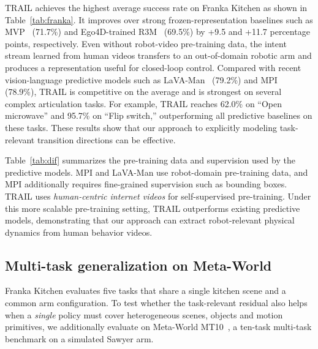 TRAIL achieves the highest average success rate on Franka Kitchen as shown in Table~\ref{tab:franka}. It improves over strong frozen-representation baselines such as MVP~\cite{radosavovic2023real} (71.7\%) and Ego4D-trained R3M~\cite{nair2022r3m} (69.5\%) by +9.5 and +11.7 percentage points, respectively. Even without robot-video pre-training data, the intent stream learned from human videos transfers to an out-of-domain robotic arm and produces a representation useful for closed-loop control.
Compared with recent vision-language predictive models such as LaVA-Man~\cite{zhu2025lava} (79.2\%) and MPI~\cite{zeng2024learning} (78.9\%), TRAIL is competitive on the average and is strongest on several complex articulation tasks. For example, TRAIL reaches {62.0\%} on ``Open microwave'' and {95.7\%} on ``Flip switch,'' outperforming all predictive baselines on these tasks. 
These results show that our approach to explicitly modeling task-relevant transition directions can be effective.



\vspace{-1pt}


Table~\ref{tab:dif} summarizes the pre-training data and supervision used by the predictive models. MPI and LaVA-Man use robot-domain pre-training data, and MPI additionally requires fine-grained supervision such as bounding boxes. TRAIL uses \textit{human-centric internet videos} for self-supervised pre-training. Under this more scalable pre-training setting, TRAIL outperforms existing predictive models, demonstrating that our approach can extract robot-relevant physical dynamics from human behavior videos.



\vspace{-1pt}

\subsection{Multi-task generalization on Meta-World}
\label{sec:exp_metaworld}
Franka Kitchen evaluates five tasks that share a single kitchen scene and a common arm configuration. To test whether the task-relevant residual also helps when a \emph{single} policy must cover heterogeneous scenes, objects and motion primitives, we additionally evaluate on Meta-World MT10~\cite{yu2020meta}, a ten-task multi-task benchmark on a simulated Sawyer arm.

